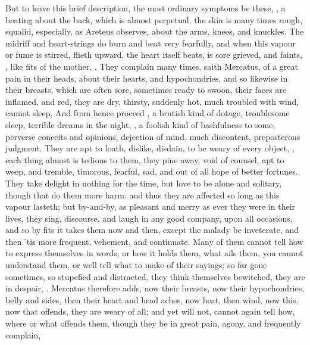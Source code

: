 {But to leave this brief description, the most ordinary symptoms be these,
, a beating about the back, which is almost
perpetual, the skin is many times rough, squalid, especially, as Areteus
observes, about the arms, knees, and knuckles. The midriff and heart-strings do
burn and beat very fearfully, and when this vapour or fume is stirred, flieth
upward, the heart itself beats, is sore grieved, and faints, , like fits of the mother, . They complain many times, saith
Mercatus, of a great pain in their heads, about their hearts, and
hypochondries, and so likewise in their breasts, which are often sore,
sometimes ready to swoon, their faces are inflamed, and red, they are dry,
thirsty, suddenly hot, much troubled with wind, cannot sleep, \etc{} And from
hence proceed , a brutish kind of dotage, troublesome
sleep, terrible dreams in the night, , a foolish kind of bashfulness to some, perverse conceits and opinions,
dejection of mind, much discontent, preposterous judgment.
They are apt to loath, dislike, disdain, to be weary of every object, \etc{},
each thing almost is tedious to them, they pine away, void of counsel, apt to
weep, and tremble, timorous, fearful, sad, and out of all hope of better
fortunes. They take delight in nothing for the time, but love to be alone and
solitary, though that do them more harm: and thus they are affected so long as
this vapour lasteth; but by-and-by, as pleasant and merry as ever they were in
their lives, they sing, discourse, and laugh in any good company, upon all
occasions, and so by fits it takes them now and then, except the malady be
inveterate, and then 'tis more frequent, vehement, and continuate. Many of them
cannot tell how to express themselves in words, or how it holds them, what ails
them, you cannot understand them, or well tell what to make of their sayings;
so far gone sometimes, so stupefied and distracted, they think themselves
bewitched, they are in despair, . Mercatus therefore adds, now their breasts, now their
hypochondries, belly and sides, then their heart and head aches, now heat, then
wind, now this, now that offends, they are weary of all;
and yet will not, cannot again tell how, where or what
offends them, though they be in great pain, agony, and frequently complain,
}
